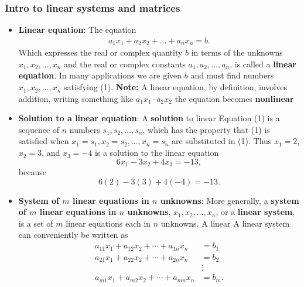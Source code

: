 \documentclass{report}
\begin{document}
    \subsubsection{Intro to linear systems and matrices}
    \begin{itemize}
                \item \textbf{Linear equation}: The equation
            \begin{align*}
                a_{1}x_{1} + a_{2}x_{2} + ... + a_{n}x_{n} = b  \tag{1}
            .\end{align*}
            Which expresses the real or complex quantity \(b\) in terms of the unknowns \(x_1, x_2, \ldots, x_n\) and the real or complex constants \(a_1, a_2, \ldots, a_n\), is called a \textbf{linear equation}. In many applications we are given \(b\) and must find numbers \(x_1, x_2, \ldots, x_n\) satisfying (1).
            \bigbreak \noindent 
            \textbf{Note:} A linear equation, by definition, involves addition, writing something like $a_{1}x_{1} \cdot  a_{2}x_{2} $ the equation becomes \textbf{nonlinear}
        \item \textbf{Solution to a linear equation}:
            A \textbf{solution} to linear Equation (1) is a sequence of \(n\) numbers \(s_1, s_2, \ldots, s_n\), which has the property that (1) is satisfied when \(x_1 = s_1, x_2 = s_2, \ldots, x_n = s_n\) are substituted in (1). Thus \(x_1 = 2\), \(x_2 = 3\), and \(x_3 = -4\) is a solution to the linear equation
            \[
                6x_1 - 3x_2 + 4x_3 = -13,
            \]
            because
            \[
                6(2) - 3(3) + 4(-4) = -13.
            \]
        \item \textbf{System of $m$ linear equations in $n$ unknowns}:
            More generally, a \textbf{system of \(m\) linear equations in \(n\) unknowns}, \(x_1, x_2, \ldots, x_n\), or a \textbf{linear system}, is a set of \(m\) linear equations each in \(n\) unknowns. A linear
            \bigbreak \noindent 
            A linear system can conveniently be written as
            \[
                \begin{aligned}
                    a_{11}x_1 + a_{12}x_2 + \cdots + a_{1n}x_n &= b_1 \\
                    a_{21}x_1 + a_{22}x_2 + \cdots + a_{2n}x_n &= b_2 \\
                                                               &\vdots \\
                    a_{m1}x_1 + a_{m2}x_2 + \cdots + a_{mn}x_n &= b_m.
                \end{aligned}
\]
\end{itemize}
\end{document}
